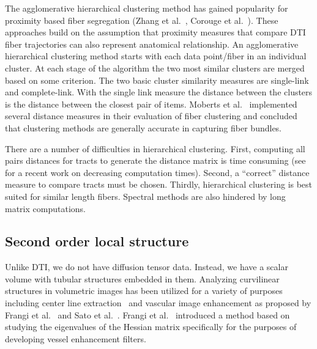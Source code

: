 The agglomerative hierarchical clustering method \cite{DudaHartStork01} has gained popularity for proximity based fiber segregation (Zhang et al.~\cite{Zhang2008}, Corouge et al.~\cite{Corouge2004}). 
These approaches build on the assumption that proximity measures that compare DTI fiber trajectories can also represent anatomical relationship. An agglomerative hierarchical clustering method starts with each data point/fiber in an individual cluster. At each stage of the algorithm the two most similar clusters are merged based on some criterion. The two basic cluster similarity measures are single-link and complete-link. With the single link measure the distance between the clusters is the distance between the closest pair of items. 
Moberts et al.~\cite{Moberts2005} implemented several distance measures in their evaluation of fiber clustering and concluded that clustering methods are generally accurate in capturing fiber bundles. 

There are a number of difficulties in hierarchical clustering. First, computing all pairs distances for tracts to generate the distance matrix is time consuming (see~\cite{Garyfallidis2012} for a recent work on decreasing computation times). Second, a ``correct'' distance measure to compare tracts must be chosen. Thirdly, hierarchical clustering is best suited for similar length fibers.
Spectral methods are also hindered by long matrix computations.


\subsection{Second order local structure}
Unlike DTI, we do not have diffusion tensor data. Instead, we have a scalar volume with tubular structures embedded in them. Analyzing curvilinear structures in volumetric images has been utilized for a variety of purposes including center line extraction~\cite{Bouix2005} and vascular image enhancement as proposed by Frangi et al.~\cite{Frangi1998} and Sato et al.~\cite{Sato1997}. Frangi et al.~\cite{Frangi1998} introduced a method based on studying the eigenvalues of the  Hessian matrix specifically for the purposes of developing vessel enhancement filters.


